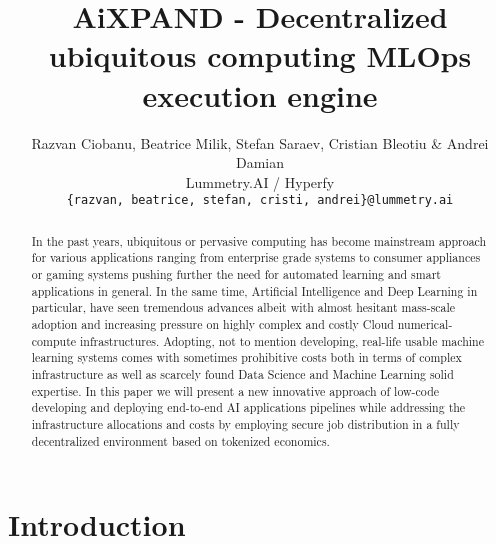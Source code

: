\documentclass{article}
\title{
AiXPAND - Decentralized ubiquitous computing MLOps execution engine
}
\author{
  Razvan Ciobanu, Beatrice Milik, Stefan Saraev, Cristian Bleotiu \& Andrei Damian \\
  Lummetry.AI / Hyperfy\\
  \texttt{\{razvan, beatrice, stefan, cristi, andrei\}@lummetry.ai} \\
}
\begin{document}
\maketitle


\begin{abstract}
In the past years, ubiquitous or pervasive computing has become mainstream approach for various applications ranging from enterprise grade systems to consumer appliances or gaming systems pushing further the need for automated learning and smart applications in general. In the same time, Artificial Intelligence and Deep Learning in particular, have seen tremendous advances albeit with almost hesitant mass-scale adoption and increasing pressure on highly complex and costly Cloud numerical-compute infrastructures. Adopting, not to mention developing, real-life usable machine learning systems comes with sometimes prohibitive costs both in terms of complex infrastructure as well as scarcely found Data Science and Machine Learning solid expertise. In this paper we will present a new innovative approach of low-code developing and deploying end-to-end AI applications pipelines while addressing the infrastructure allocations and costs by employing secure job distribution in a fully decentralized environment based on tokenized economics. 
\end{abstract}



\section{Introduction}
\end{document}
